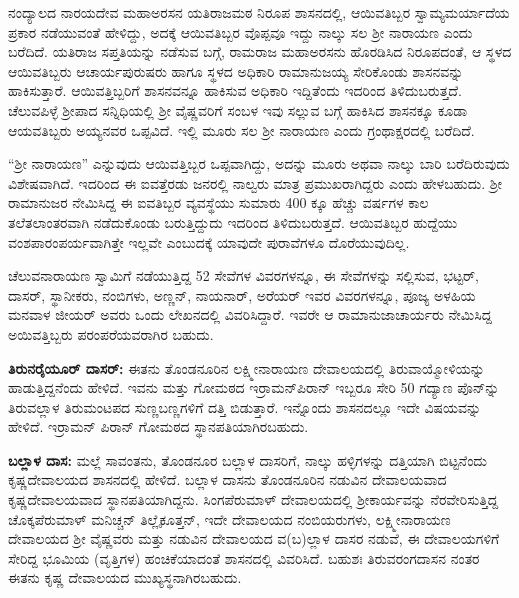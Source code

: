 ನಂದ್ಯಾಲದ ನಾರಯದೇವ ಮಹಾಅರಸನ ಯತಿರಾಜಮಠ ನಿರೂಪ ಶಾಸನದಲ್ಲಿ, ಆಯಿವತಿಬ್ಬರ ಸ್ವಾಮ್ಯ\break ಮರ್ಯಾದೆಯ ಪ್ರಕಾರ ನಡೆಯುವಂತೆ ಹೇಳಿದ್ದು, ಅದಕ್ಕೆ ಆಯಿವತಿಬ್ಬರ ವೊಪ್ಪವೂ ಇದ್ದು ನಾಲ್ಕು ಸಲ ಶ‍್ರೀ ನಾರಾಯಣ ಎಂದು ಬರೆದಿದೆ. ಯತಿರಾಜ ಸಪ್ತತಿಯನ್ನು ನಡೆಸುವ ಬಗ್ಗೆ, ರಾಮರಾಜ ಮಹಾಅರಸನು ಹೊರಡಿಸಿದ ನಿರೂಪದಂತೆ, ಆ ಸ್ಥಳದ ಆಯಿವತಿಬ್ಬರು ಆಚಾರ್ಯಪುರುಷರು ಹಾಗೂ ಸ್ಥಳದ ಅಧಿಕಾರಿ ರಾಮಾನುಜಯ್ಯ ಸೇರಿಕೊಂಡು ಶಾಸನವನ್ನು ಹಾಕಿಸುತ್ತಾರೆ. ಆಯಿವತ್ತಿಬ್ಬರಿಗೆ ಶಾಸನವನ್ನೂ ಹಾಕಿಸುವ ಅಧಿಕಾರಿ ಇದ್ದಿತೆಂದು ಇದರಿಂದ ತಿಳಿದುಬರುತ್ತದೆ. ಚೆಲುವಪಿಳ್ಳೆ ಶ‍್ರೀಪಾದ ಸನ್ನಿಧಿಯಲ್ಲಿ ಶ‍್ರೀ ವೈಷ್ಣವರಿಗೆ ಸಂಬಳ ಇವು ಸಲ್ಲುವ ಬಗ್ಗೆ ಹಾಕಿಸಿದ ಶಾಸನಕ್ಕೂ ಕೂಡಾ ಆಯವತಿಬ್ಬರು ಅಯ್ಯನವರ ಒಪ್ಪವಿದೆ. ಇಲ್ಲಿ ಮೂರು ಸಲ ಶ‍್ರೀ ನಾರಾಯಣ ಎಂದು ಗ್ರಂಥಾಕ್ಷರದಲ್ಲಿ ಬರೆದಿದೆ.

“ಶ‍್ರೀ ನಾರಾಯಣ” ಎನ್ನುವುದು ಆಯಿವತ್ತಿಬ್ಬರ ಒಪ್ಪವಾಗಿದ್ದು, ಅದನ್ನು ಮೂರು ಅಥವಾ ನಾಲ್ಕು ಬಾರಿ ಬರೆದಿರುವುದು ವಿಶೇಷವಾಗಿದೆ. ಇದರಿಂದ ಈ ಐವತ್ತೆರಡು ಜನರಲ್ಲಿ ನಾಲ್ವರು ಮಾತ್ರ ಪ್ರಮುಖರಾಗಿದ್ದರು ಎಂದು ಹೇಳಬಹುದು. ಶ‍್ರೀ ರಾಮಾನುಜರ ನೇಮಿಸಿದ್ದ ಈ ಐವತಿಬ್ಬರ ವ್ಯವಸ್ಥೆಯು ಸುಮಾರು 400 ಕ್ಕೂ ಹೆಚ್ಚು ವರ್ಷಗಳ ಕಾಲ ತಲೆತಲಾಂತರವಾಗಿ ನಡೆದುಕೊಂಡು ಬರುತ್ತಿದ್ದುದು ಇದರಿಂದ ತಿಳಿದುಬರುತ್ತದೆ. ಆಯಿವತಿಬ್ಬರ ಹುದ್ದೆಯು ವಂಶಪಾರಂಪರ್ಯವಾಗಿತ್ತೇ ಇಲ್ಲವೇ ಎಂಬುದಕ್ಕೆ ಯಾವುದೇ ಪುರಾವೆಗಳೂ ದೊರೆಯುವುದಿಲ್ಲ.

\newpage

ಚೆಲುವನಾರಾಯಣ ಸ್ವಾಮಿಗೆ ನಡೆಯುತ್ತಿದ್ದ 52 ಸೇವೆಗಳ ವಿವರಗಳನ್ನೂ, ಈ ಸೇವೆಗಳನ್ನು ಸಲ್ಲಿಸುವ, ಭಟ್ಟರ್​, ದಾಸರ್​, ಸ್ಥಾನೀಕರು, ನಂಬಿಗಳು, ಅಣ್ಣನ್​, ನಾಯನಾರ್​, ಅರೆಯರ್​ ಇವರ ವಿವರಗಳನ್ನೂ, ಪೂಜ್ಯ ಅಳಹಿಯ ಮನವಾಳ ಜೀಯರ್​ ಅವರು ಒಂದು ಲೇಖನದಲ್ಲಿ ವಿವರಿಸಿದ್ದಾರೆ. ಇವರೇ ಆ ರಾಮಾನುಜಾಚಾರ್ಯರು ನೇಮಿಸಿದ್ದ ಅಯಿವತ್ತಿಬ್ಬರು ಪರಂಪರೆಯವರಾಗಿರ ಬಹುದು.

\textbf{ತಿರುನರೈಯೂರ್​ ದಾಸರ್​:} ಈತನು ತೊಂಡನೂರಿನ ಲಕ್ಷ್ಮೀನಾರಾಯಣ ದೇವಾಲಯದಲ್ಲಿ ತಿರುವಾಯ್ಮೋಳಿಯನ್ನು ಹಾಡುತ್ತಿದ್ದ\-ನೆಂದು ಹೇಳಿದೆ. ಇವನು ಮತ್ತು ಗೋಮಠದ ಇರ್ರಾಮನ್​ಪಿರಾನ್​ ಇಬ್ಬರೂ ಸೇರಿ 50 ಗದ್ಯಾಣ ಪೊನ್​ನ್ನು ತಿರುವಲ್ಲಾಳ ತಿರುಮಂಟಪದ ಸುಣ್ಣಬಣ್ಣಗಳಿಗೆ ದತ್ತಿ ಬಿಡುತ್ತಾರೆ. ಇನ್ನೊಂದು ಶಾಸನದಲ್ಲೂ ಇದೇ ವಿಷಯವನ್ನು ಹೇಳಿದೆ. ಇರ್ರಾಮನ್​ ಪಿರಾನ್​ ಗೋಮಠದ ಸ್ಥಾನಪತಿಯಾಗಿರಬಹುದು.

\textbf{ಬಲ್ಲಾಳ ದಾಸ:} ಮಲ್ಲೆ ಸಾವಂತನು, ತೊಂಡನೂರ ಬಲ್ಲಾಳ ದಾಸರಿಗೆ, ನಾಲ್ಕು ಹಳ್ಳಿಗಳನ್ನು ದತ್ತಿಯಾಗಿ ಬಿಟ್ಟನೆಂದು ಕೃಷ್ಣದೇವಾಲಯದ ಶಾಸನದಲ್ಲಿ ಹೇಳಿದೆ. ಬಲ್ಲಾಳ ದಾಸನು ತೊಂಡನೂರಿನ ನಡುವಿನ ದೇವಾಲಯವಾದ ಕೃಷ್ಣದೇವಾಲಯವಾದ ಸ್ಥಾನಪತಿಯಾಗಿದ್ದನು. ಸಿಂಗಪೆರುಮಾಳ್​ ದೇವಾಲಯದಲ್ಲಿ ಶ‍್ರೀಕಾರ್ಯವನ್ನು ನೆರವೇರಿಸುತ್ತಿದ್ದ ಚೊಕ್ಕಪೆರುಮಾಳ್​ ಮನಿಚ್ಚನ್​ ತಿಲ್ಲೈಕೂತ್ತನ್​, ಇದೇ ದೇವಾಲಯದ ನಂಬಿಯರುಗಳು, ಲಕ್ಷ್ಮೀನಾರಾಯಣ ದೇವಾಲಯದ ಶ‍್ರೀ ವೈಷ್ಣವರು ಮತ್ತು ನಡುವಿನ ದೇವಾಲಯದ ವ(ಬ)ಲ್ಲಾಳ ದಾಸರ ನಡುವೆ, ಈ ದೇವಾಲಯಗಳಿಗೆ ಸೇರಿದ್ದ ಭೂಮಿಯ (ವೃತ್ತಿಗಳ) ಹಂಚಿಕೆಯಾದಂತೆ ಶಾಸನದಲ್ಲಿ ವಿವರಿಸಿದೆ. ಬಹುಶಃ ತಿರುವರಂಗದಾಸನ ನಂತರ ಈತನು ಕೃಷ್ಣ ದೇವಾಲಯದ ಮುಖ್ಯಸ್ಥನಾಗಿರಬಹುದು.

